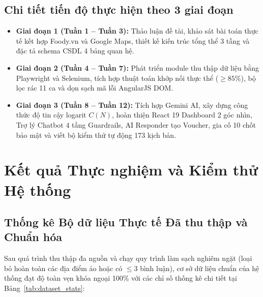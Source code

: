 \documentclass[12pt, a4paper]{article}
\begin{document}
\subsection{Chi tiết tiến độ thực hiện theo 3 giai đoạn}
\begin{itemize}[leftmargin=1.2cm]
    \item \textbf{Giai đoạn 1 (Tuần 1 -- Tuần 3):} Thảo luận đề tài, khảo sát bài toán thực tế kết hợp Foody.vn và Google Maps, thiết kế kiến trúc tổng thể 3 tầng và đặc tả schema CSDL 4 bảng quan hệ.
    \item \textbf{Giai đoạn 2 (Tuần 4 -- Tuần 7):} Phát triển module thu thập dữ liệu bằng Playwright và Selenium, tích hợp thuật toán khớp nối thực thể ($\ge 85\%$), bộ lọc rác 11 ca và dọn sạch mã lỗi AngularJS DOM.
    \item \textbf{Giai đoạn 3 (Tuần 8 -- Tuần 12):} Tích hợp Gemini AI, xây dựng công thức độ tin cậy logarit $C(N)$, hoàn thiện React 19 Dashboard 2 góc nhìn, Trợ lý Chatbot 4 tầng Guardrails, AI Responder tạo Voucher, gia cố 10 chốt bảo mật và viết bộ kiểm thử tự động 173 kịch bản.
\end{itemize}

\newpage
\section{Kết quả Thực nghiệm và Kiểm thử Hệ thống}

\subsection{Thống kê Bộ dữ liệu Thực tế Đã thu thập và Chuẩn hóa}
Sau quá trình thu thập đa nguồn và chạy quy trình làm sạch nghiêm ngặt (loại bỏ hoàn toàn các địa điểm ảo hoặc có $\le 3$ bình luận), cơ sở dữ liệu chuẩn của hệ thống đạt độ toàn vẹn khóa ngoại 100\% với các chỉ số thống kê chi tiết tại Bảng~\ref{tab:dataset_stats}:
\end{document}
